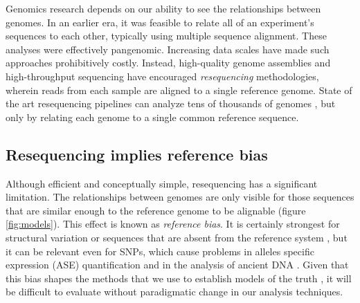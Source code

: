 Genomics research depends on our ability to see the relationships between genomes.
In an earlier era, it was feasible to relate all of an experiment's sequences to each other, typically using multiple sequence alignment.
These analyses were effectively pangenomic. 
Increasing data scales have made such approaches prohibitively costly.
Instead, high-quality genome assemblies and high-throughput sequencing have encouraged \emph{resequencing} methodologies, wherein reads from each sample are aligned to a single reference genome.
State of the art resequencing pipelines can analyze tens of thousands of genomes \cite{Poplin_2017}, but only by relating each genome to a single common reference sequence.

\subsection{Resequencing implies reference bias}

Although efficient and conceptually simple, resequencing has a significant limitation.
The relationships between genomes are only visible for those sequences that are similar enough to the reference genome to be alignable (figure \ref{fig:models}).
This effect is known as \emph{reference bias}.
It is certainly strongest for structural variation or sequences that are absent from the reference system \cite{sudmant2015integrated}, but it can be relevant even for SNPs, which cause problems in alleles specific expression (ASE) quantification \cite{Castel2015-ef} and in the analysis of ancient DNA \cite{zhou2017antcaller}.
Given that this bias shapes the methods that we use to establish models of the truth \cite{zook2014integrating}, it will be difficult to evaluate without paradigmatic change in our analysis techniques.

